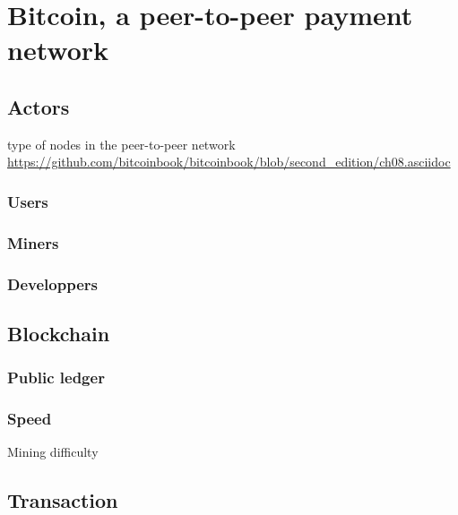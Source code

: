 \chapter{Bitcoin, a peer-to-peer payment network}
\label{chap:bitcoin}


\minitoc

\newpage

\section{Actors}


type of nodes in the peer-to-peer network
\url{https://github.com/bitcoinbook/bitcoinbook/blob/second_edition/ch08.asciidoc}

\subsection{Users}
\subsection{Miners}
\subsection{Developpers}


\section{Blockchain}


\subsection{Public ledger}
\subsection{Speed}
Mining difficulty

\section{Transaction}

